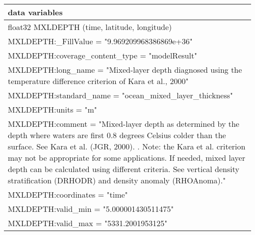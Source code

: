 \begin{longtable}{|p{\textwidth}|}
data variables\\
\hline
\hspace{0.5cm}float32 MXLDEPTH (time, latitude, longitude)\\
\hspace{0.5cm}\hspace{0.5cm}MXLDEPTH:\_FillValue = "9.969209968386869e+36"\\
\hspace{0.5cm}\hspace{0.5cm}MXLDEPTH:coverage\_content\_type = "modelResult"\\
\hspace{0.5cm}\hspace{0.5cm}MXLDEPTH:long\_name = "Mixed-layer depth diagnosed using the temperature difference criterion of Kara et al., 2000"\\
\hspace{0.5cm}\hspace{0.5cm}MXLDEPTH:standard\_name = "ocean\_mixed\_layer\_thickness"\\
\hspace{0.5cm}\hspace{0.5cm}MXLDEPTH:units = "m"\\
\hspace{0.5cm}\hspace{0.5cm}MXLDEPTH:comment = "Mixed-layer depth as determined by the depth where waters are first 0.8 degrees Celsius colder than the surface. See Kara et al. (JGR, 2000). . Note: the Kara et al. criterion may not be appropriate for some applications. If needed, mixed layer depth can be calculated using different criteria. See vertical density stratification (DRHODR) and density anomaly (RHOAnoma)."\\
\hspace{0.5cm}\hspace{0.5cm}MXLDEPTH:coordinates = "time"\\
\hspace{0.5cm}\hspace{0.5cm}MXLDEPTH:valid\_min = "5.000001430511475"\\
\hspace{0.5cm}\hspace{0.5cm}MXLDEPTH:valid\_max = "5331.2001953125"\\
\hline
\end{longtable}